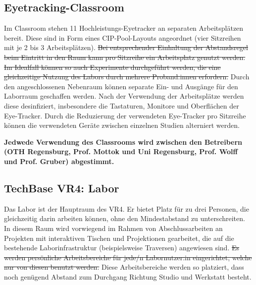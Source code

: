 \subsection{Eyetracking-Classroom}\label{subsec:labore_eyetracking}


\noindent
Im Classroom stehen 11 Hochleistungs-Eyetracker an separaten Arbeitsplätzen bereit.
Diese sind in Form eines CIP-Pool-Layouts angeordnet (vier Sitzreihen mit je 2 bis 3 Arbeitsplätzen).
\sout{Bei entsprechender Einhaltung der Abstandsregel beim Eintritt in den Raum kann pro Sitzreihe ein Arbeitsplatz genutzt werden.}
\sout{Im Idealfall können so auch Experimente durchgeführt werden, die eine gleichzeitige Nutzung des Labors durch mehrere Proband:innen erfordern.}
Durch den angeschlossenen Nebenraum können separate Ein- und Ausgänge für den Laborraum geschaffen werden.
Nach der Verwendung der Arbeitsplätze werden diese desinfiziert, insbesondere die Tastaturen, Monitore und Oberflächen der Eye-Tracker.
Durch die Reduzierung der verwendeten Eye-Tracker pro Sitzreihe können die verwendeten Geräte zwischen einzelnen Studien alterniert werden.

\medskip

\noindent
\textbf{Jedwede Verwendung des Classrooms wird zwischen den Betreibern (OTH Regensburg, Prof. Mottok und Uni Regensburg, Prof. Wolff und Prof. Gruber) abgestimmt.}

\subsection{TechBase VR4: Labor}\label{subsec:labore_vr4_labor}


\noindent
Das Labor ist der Hauptraum des VR4.
Er bietet Platz für zu drei Personen, die gleichzeitig darin arbeiten können, ohne den Mindestabstand zu unterschreiten.
In diesem Raum wird vorwiegend im Rahmen von Abschlussarbeiten an Projekten mit interaktiven Tischen und Projektionen gearbeitet, die auf die bestehende Laborinfrastruktur (beispielsweise Traversen) angewiesen sind.
\sout{Es werden persönliche Arbeitsbereiche für jede/n Labornutzer:in eingerichtet, welche nur von diesen benutzt werden.}
Diese Arbeitsbereiche werden so platziert, dass noch genügend Abstand zum Durchgang Richtung Studio und Werkstatt besteht.

